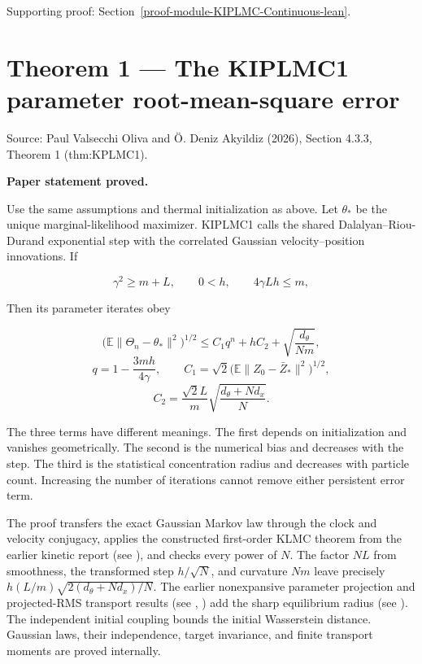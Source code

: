 \documentclass[11pt,a4paper]{report}
\begin{document}
{\small\color{gray}Supporting proof: Section~\ref{proof-module-KIPLMC-Continuous-lean}.\par}
\section{\texorpdfstring{Theorem 1 — The KIPLMC1 parameter root-mean-square error}{Theorem 1 — The KIPLMC1 parameter root-mean-square error}}


Source: Paul Valsecchi Oliva and Ö. Deniz Akyildiz (2026), Section 4.3.3, Theorem 1 (thm:KPLMC1).



\textbf{Paper statement proved.}



Use the same assumptions and thermal initialization as above. Let \(\theta_*\) be the unique marginal-likelihood maximizer. KIPLMC1 calls the shared Dalalyan–Riou-Durand exponential step with the correlated Gaussian velocity–position innovations. If


\[\gamma^2\ge m+L,\qquad 0<h,\qquad4\gamma Lh\le m,\]


Then its parameter iterates obey


\[\boxed{\bigl(\mathbb E\|\Theta_n-\theta_*\|^2\bigr)^{1/2}\le C_1q^n+hC_2+\sqrt{\frac{d_\theta}{Nm}},}\]
\[q=1-\frac{3mh}{4\gamma},\qquad C_1=\sqrt2\bigl(\mathbb E\|Z_0-\bar Z_*\|^2\bigr)^{1/2},\]
\[C_2=\frac{\sqrt2L}{m}\sqrt{\frac{d_\theta+Nd_x}{N}}.\]


The three terms have different meanings. The first depends on initialization and vanishes geometrically. The second is the numerical bias and decreases with the step. The third is the statistical concentration radius and decreases with particle count. Increasing the number of iterations cannot remove either persistent error term.




The proof transfers the exact Gaussian Markov law through the clock and velocity conjugacy, applies the constructed first-order KLMC theorem from the earlier kinetic report (see \cite[Section~3.57.19]{LangevinLean2026Kinetic}), and checks every power of \(N\). The factor \(NL\) from smoothness, the transformed step \(h/\sqrt N\), and curvature \(Nm\) leave precisely \(h(L/m)\sqrt{2(d_\theta+Nd_x)/N}\). The earlier nonexpansive parameter projection and projected-RMS transport results (see \cite[Section~3.1.6]{LangevinLean2026IPLA}, \cite[Section~3.48.9]{LangevinLean2026ULASC}) add the sharp equilibrium radius (see \cite[Section~3.6.1]{LangevinLean2026Proximal}). The independent initial coupling bounds the initial Wasserstein distance. Gaussian laws, their independence, target invariance, and finite transport moments are proved internally.
\end{document}
